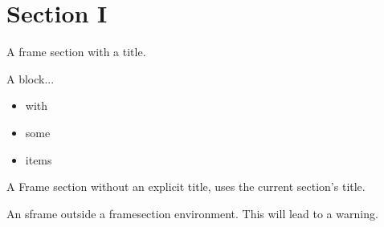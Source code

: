 \documentclass{beamer}
\begin{document}
\section*{Section I}

\begin{framesection}
  \begin{sframe}
    A frame section with a title.
  \end{sframe}

  \begin{sframe}
    \begin{block}{A block...}
        \begin{itemize}
          \item with 
          \item some
          \item items
        \end{itemize}
    \end{block}
  \end{sframe}

\end{framesection}

\begin{framesection}
  \begin{sframe}
    A Frame section without an explicit title, uses the current section's title.
  \end{sframe}
\end{framesection}

\begin{sframe}
  An sframe outside a framesection environment.
  This will lead to a warning.
\end{sframe}
\end{document}
